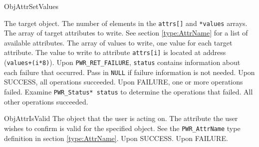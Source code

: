\begin{prototype}{ObjAttrSetValues}

			{\pInput}{The target object.}
				{\pInput}{The number of elements in the \texttt{attrs[]} and \texttt{*values} arrays.}
		{\pInput}{The array of target attributes to write. See section \ref{type:AttrName} for a list of available attributes.}
			{\pInput}{The array of values to write, one value for each target attribute. The value to write to attribute \texttt{attrs[i]} is located at address (\texttt{values+(i*8)}).}
			{\pOutput}{Upon \texttt{PWR_RET_FAILURE}, \texttt{status} contains information about each failure that occurred. Pass in \texttt{NULL} if failure information is not needed.}
	 		{Upon SUCCESS, all operations succeeded.}
	 		{Upon FAILURE, one or more operations failed. Examine \texttt{PWR_Status* status} to determine the operations that failed. All other operations succeeded.}
\end{prototype}
\begin{prototype}{ObjAttrIsValid}
		{\pInput}{The object that the user is acting on.}
		{\pInput}{The attribute the user wishes to confirm is valid for the specified object.  See the \texttt{PWR_AttrName} type definition in section \ref{type:AttrName}.}
	 {Upon SUCCESS.}
	 {Upon FAILURE.}
\end{prototype}

